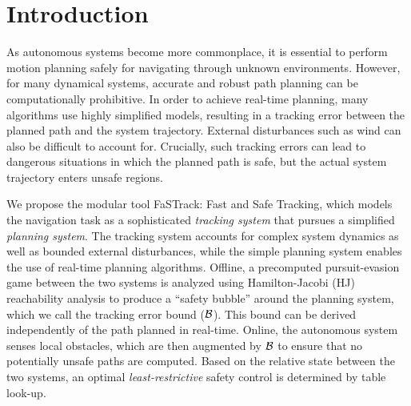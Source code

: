 \section{Introduction}
 As autonomous systems become more commonplace, it is essential to perform motion planning safely for navigating through unknown environments. However, for many dynamical systems, accurate and robust path planning can be computationally prohibitive. In order to achieve real-time planning, many algorithms use highly simplified models, resulting in a tracking error between the planned path and the system trajectory. External disturbances such as wind can also be difficult to account for. Crucially, such tracking errors can lead to dangerous situations in which the planned path is safe, but the actual system trajectory enters unsafe regions.
 


We propose the modular tool FaSTrack: Fast and Safe Tracking, which models the navigation task as a sophisticated \textit{tracking system} that pursues a simplified \textit{planning system}. The tracking system accounts for complex system dynamics as well as bounded external disturbances, while the simple planning system enables the use of real-time planning algorithms. Offline, a precomputed pursuit-evasion game between the two systems is analyzed using Hamilton-Jacobi (HJ) reachability analysis to produce a ``safety bubble'' around the planning system, which we call the tracking error bound ($\mathcal B$). This bound can be derived independently of the path planned in real-time. Online, the autonomous system senses local obstacles, which are then augmented by $\mathcal B$ to ensure that no potentially unsafe paths are computed. Based on the relative state between the two systems, an optimal \textit{least-restrictive} safety control is determined by table look-up. %


